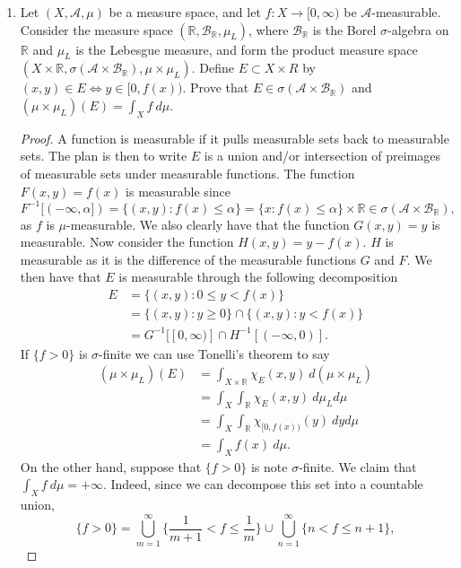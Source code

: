 \documentclass[11pt,letterpaper]{report}
\newcommand{\reals}{\mathbb{R}}
\newcommand{\mcal}[1]{\mathcal{#1}}
\begin{document}
\begin{enumerate}
	\item Let $(X, \mcal{A}, \mu)$ be a measure space, and let $f: X\to [0, \infty)$ be $\mcal{A}$-measurable. Consider the measure space $(\reals, \mcal{B}_\reals, \mu_L)$, where $\mcal{B}_\reals$ is the Borel $\sigma$-algebra on $\reals$ and $\mu_L$ is the Lebesgue measure, and form the product measure space $(X\times \reals, \sigma(\mcal{A}\times \mcal{B}_\reals), \mu\times \mu_L)$. Define $E\subset X\times R$ by $(x,y)\in E\iff y\in [0, f(x))$. Prove that $E\in \sigma(\mcal{A}\times \mcal{B}_\reals)$ and $(\mu\times \mu_L)(E) = \int_Xf\ d\mu$.
	\begin{proof}
		A function is measurable if it pulls measurable sets back to measurable sets. The plan is then to write $E$ is a union and/or intersection of preimages of measurable sets under measurable functions. The function $F(x,y) = f(x)$ is measurable since
		\[
		F^{-1}[(-\infty, \alpha]) = \{(x,y): f(x)\leq \alpha\} = \{x: f(x)\leq \alpha\} \times \reals \in \sigma(\mcal{A}\times \mcal{B}_\reals),
		\]
		as $f$ is $\mu$-measurable. We also clearly have that the function $G(x,y) = y$ is measurable. Now consider the function $H(x,y) = y-f(x)$. $H$ is measurable as it is the difference of the measurable functions $G$ and $F$. We then have that $E$ is measurable through the following decomposition
		\begin{align*}
			E &= \{(x,y): 0\leq y<f(x)\}\\
			&= \{(x,y): y\geq 0\} \cap \{(x,y): y<f(x)\}\\
			&= G^{-1}[[0, \infty)]\cap H^{-1}[(-\infty, 0)].
		\end{align*}
		If $\{f>0\}$ is $\sigma$-finite we can use Tonelli's theorem to say
		\begin{align*}
			(\mu\times \mu_L)(E) &= \int_{X\times \reals}\chi_E(x,y)\ d(\mu\times \mu_L)\\
			&= \int_X\int_\reals\chi_E(x,y)\ d\mu_Ld\mu\\
			&= \int_X\int_\reals \chi_{[0, f(x))}(y)\ dyd\mu\\
			&= \int_Xf(x)\ d\mu.
		\end{align*}
		On the other hand, suppose that $\{f>0\}$ is note $\sigma$-finite. We claim that $\int_Xf\ d\mu = +\infty$. Indeed, since we can decompose this set into a countable union,
		\begin{equation}\label{s16_5_main}
		\{f>0\} = \bigcup_{m=1}^\infty \{\frac{1}{m+1}<f\leq \frac{1}{m}\} \cup \bigcup_{n=1}^\infty\{n<f\leq n+1\},
		\end{equation}

\end{proof}
\end{enumerate}
\end{document}
